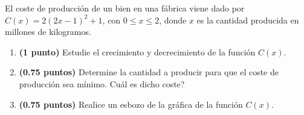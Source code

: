 
El coste de producción de un bien en una fábrica viene dado por
$C(x)=2(2x-1)^2+1$, con $0\leq x\leq 2$, donde $x$ es la cantidad producida
en millones de kilogramos.

\begin{enumerate}[label=\alph*)]
  \item \textbf{(1 punto)} Estudie el crecimiento y decrecimiento de la función
  $C(x)$.
  \item \textbf{(0.75 puntos)} Determine la cantidad a producir para que el
  coste de producción sea mínimo. \textquestiondown{}Cuál es dicho coste?
  \item \textbf{(0.75 puntos)} Realice un esbozo de la gráfica de la función
  $C(x)$.
\end{enumerate}
